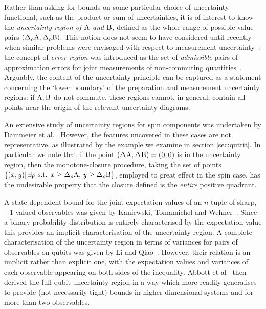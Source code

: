 Rather than asking for bounds on some particular choice of uncertainty functional, such as the product or sum of uncertainties, it is of interest to know the \emph{uncertainty region of $\operatorname{A}$ and $\operatorname{B}$}, defined as the whole range of possible value pairs $(\sdevr{\opa},\sdevr{\opb})$. This notion does not seem to have considered until recently when similar problems were envisaged with respect to measurement uncertainty~\cite{DammeierSchwonnekWerner2015,LiQiao2015,ZhangZhangYu2017,BuschBullock2018}: the concept of {\em error region} was introduced as the set of {\em admissible} pairs of approximation errors for joint measurements of non-commuting quantities~\cite{BuschHeinosaari2008}. Arguably, the content of the uncertainty principle can be captured as a statement concerning the `lower boundary' of the preparation and measurement uncertainty regions:
if $\operatorname{A},\operatorname{B}$ do not commute, these regions cannot, in general, contain all points near the origin of the relevant uncertainty diagrams.

An extensive study of uncertainty regions for spin components was undertaken by  Dammeier et al.~\cite{DammeierSchwonnekWerner2015}
However, the features uncovered in these cases are not representative, as illustrated by the example we examine in section \ref{sec:qutrit}. In particular we note that if the point $(\sdev{\opa},\sdev{\opb} ) = (0,0)$ is in the uncertainty region, then the monotone-closure procedure, taking the set of points $\{(x,y) |\, \exists \rho \text{ s.t. } x\geq \sdevr{\opa},\, y\geq\sdevr{\opb}\}$, employed to great effect in the spin case, has the undesirable property that the closure defined is the \emph{entire} positive quadrant.

A state dependent bound for the joint expectation values of an $n$-tuple of sharp, $\pm 1$-valued observables was given by Kaniewski, Tomamichel and Wehner~\cite{KaniewskiTomamichelWehner2015}. Since a binary probability distribution is entirely characterised by the expectation value this provides an implicit characterisation of the uncertainty region. A complete characterisation of the uncertainty region in terms of variances for pairs of observables on qubits was given by Li and Qiao~\cite{LiQiao2015}. However, their relation is an implicit rather than explicit one, with the expectation values and variances of each observable appearing on both sides of the inequality. Abbott et al~\cite{AbbottAlzieuHallBranciard2016}  then derived the full qubit uncertainty region in a way which more readily generalises to provide (not-necessarily tight) bounds in higher dimensional systems and for more than two observables.

